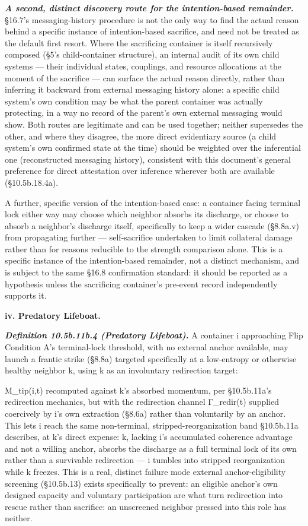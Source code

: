 \documentclass[
]{article}
\begin{document}
\emph{\textbf{A second, distinct discovery route for the intention-based
remainder.}} §16.7's messaging-history procedure is not the only way to
find the actual reason behind a specific instance of intention-based
sacrifice, and need not be treated as the default first resort. Where
the sacrificing container is itself recursively composed (§5's
child-container structure), an internal audit of its own child systems
--- their individual states, couplings, and resource allocations at the
moment of the sacrifice --- can surface the actual reason directly,
rather than inferring it backward from external messaging history alone:
a specific child system's own condition may be what the parent container
was actually protecting, in a way no record of the parent's own external
messaging would show. Both routes are legitimate and can be used
together; neither supersedes the other, and where they disagree, the
more direct evidentiary source (a child system's own confirmed state at
the time) should be weighted over the inferential one (reconstructed
messaging history), consistent with this document's general preference
for direct attestation over inference wherever both are available
(§10.5b.18.4a).

A further, specific version of the intention-based case: a container
facing terminal lock either way may choose which neighbor absorbs its
discharge, or choose to absorb a neighbor's discharge itself,
specifically to keep a wider cascade (§8.8a.v) from propagating further
--- self-sacrifice undertaken to limit collateral damage rather than for
reasons reducible to the strength comparison alone. This is a specific
instance of the intention-based remainder, not a distinct mechanism, and
is subject to the same §16.8 confirmation standard: it should be
reported as a hypothesis unless the sacrificing container's pre-event
record independently supports it.

\textbf{iv. Predatory Lifeboat.}

\emph{\textbf{Definition 10.5b.11b.4 (Predatory Lifeboat).}} A container
i approaching Flip Condition A's terminal-lock threshold, with no
external anchor available, may launch a frantic strike (§8.8a) targeted
specifically at a low-entropy or otherwise healthy neighbor k, using k
as an involuntary redirection target:

M\_tip(i,t) recomputed against k's absorbed momentum, per §10.5b.11a's
redirection mechanics, but with the redirection channel Γ\_redir(t)
supplied coercively by i's own extraction (§8.6a) rather than
voluntarily by an anchor. This lets i reach the same non-terminal,
stripped-reorganization band §10.5b.11a describes, at k's direct
expense: k, lacking i's accumulated coherence advantage and not a
willing anchor, absorbs the discharge as a full terminal lock of its own
rather than a survivable redirection --- i tumbles into stripped
reorganization while k freezes. This is a real, distinct failure mode
external anchor-eligibility screening (§10.5b.13) exists specifically to
prevent: an eligible anchor's own designed capacity and voluntary
participation are what turn redirection into rescue rather than
sacrifice: an unscreened neighbor pressed into this role has neither.
\end{document}
